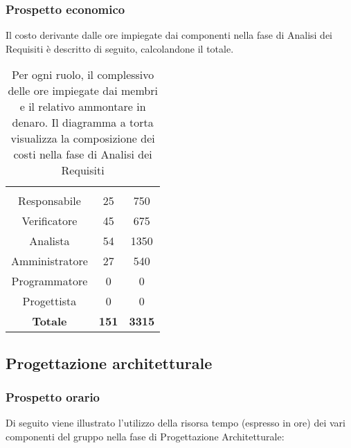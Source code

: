 \subsubsection{Prospetto economico}
Il costo derivante dalle ore impiegate dai componenti nella fase di Analisi dei Requisiti è descritto di seguito, calcolandone il totale.

\begin{table}[H]
	{\setlength{\parindent}{0cm}
		\begin{minipage}{.43\textwidth}
			\begin{tabular}{ccc}
				\rowcolorhead
				\headertitle{Ruolo} & \headertitle{Ore} & \headertitle{Costo(€)}\\
				Responsabile & 25 & 750\\
				Verificatore & 45 & 675\\
				Analista & 54 & 1350\\
				Amministratore & 27 & 540\\
				Programmatore & 0 & 0\\
				Progettista & 0 & 0\\
				\hline
				\textbf{Totale} & \textbf{151} & \textbf{3315}\\
			\end{tabular}
		\end{minipage}%
		\begin{minipage}{.57\textwidth}
	\end{minipage} }
	\caption[Prospetto economico della fase di Analisi dei Requisiti]{Per ogni ruolo, il complessivo delle ore impiegate dai membri e il relativo ammontare in denaro. Il diagramma a torta visualizza la composizione dei costi nella fase di Analisi dei Requisiti}
\end{table}

\subsection{Progettazione architetturale}

\subsubsection{Prospetto orario}
Di seguito viene illustrato l'utilizzo della risorsa tempo (espresso in ore) dei vari componenti del gruppo nella fase di Progettazione Architetturale:

